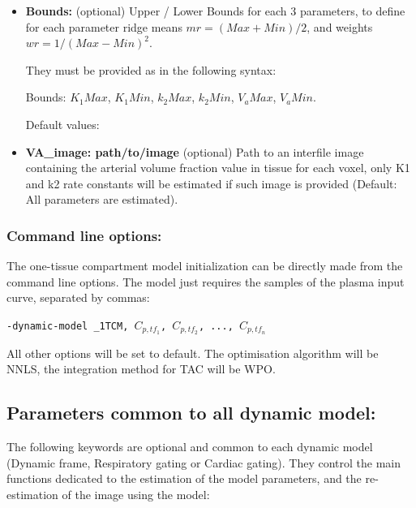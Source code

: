 \documentclass[a4paper, 11pt]{article}
\begin{document}
\begin{itemize}
\item \textbf{Bounds:} (optional) Upper / Lower Bounds for each 3 parameters, to define for each parameter ridge means $mr=(Max+Min)/2$, and weights $wr=1/(Max-Min)^2$.

They must be provided as in the following syntax:

\bigskip
Bounds: $K_1Max$, $K_1Min$, $k_2Max$, $k_2Min$, $V_aMax$, $V_aMin$.
\bigskip

Default values:

\item \textbf{VA\_image: path/to/image} (optional) Path to an interfile image containing the arterial volume fraction value in tissue for each voxel, only K1 and k2 rate constants will be estimated if such image is provided (Default: All parameters are estimated).

\end{itemize}




\subsubsection{Command line options:}
\label{sss_1TCM_list}

   The one-tissue compartment model initialization can be directly made from the command line options. The model just requires the samples of the plasma input curve, separated by commas:


\bigskip
\texttt{-dynamic-model \_1TCM,  $C_{p,tf_1}$, $C_{p,tf_2}$, ..., $C_{p,tf_n}$}
\bigskip



All other options will be set to default. The optimisation algorithm will be NNLS, the integration method for TAC will be WPO.
   
   
   
   
\newpage
\subsection{Parameters common to all dynamic model:} 
\label{ss_common_parameters}

The following keywords are optional and common to each dynamic model (Dynamic frame, Respiratory gating or Cardiac gating). They control the main functions dedicated to the estimation of the model parameters, and the re-estimation of the image using the model:
\end{document}
